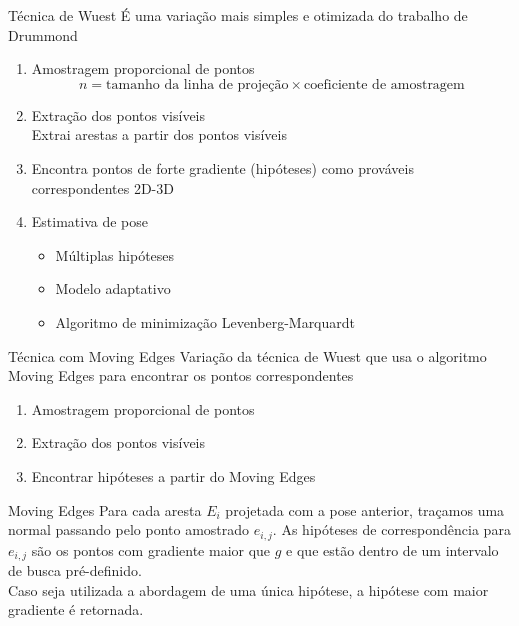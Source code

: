 \documentclass{beamer}
\begin{document}
\begin{frame}{Técnica de Wuest}
    É uma variação mais simples e otimizada do trabalho de Drummond
    \begin{enumerate}
        \item Amostragem proporcional de pontos
            \[
                n = \textrm{tamanho da linha de projeção} \times \textrm{coeficiente de amostragem}
            \]
        \item Extração dos pontos visíveis \\
            Extrai arestas a partir dos pontos visíveis
        \item Encontra pontos de forte gradiente (hipóteses) como prováveis correspondentes 2D-3D
        \item Estimativa de pose
            \begin{itemize}
                \item Múltiplas hipóteses
                \item Modelo adaptativo
                \item Algoritmo de minimização Levenberg-Marquardt
            \end{itemize}
    \end{enumerate}
\end{frame}

\begin{frame}{Técnica com Moving Edges}
    Variação da técnica de Wuest que usa o algoritmo Moving Edges para encontrar os pontos correspondentes
    \begin{enumerate}
        \item Amostragem proporcional de pontos
        \item Extração dos pontos visíveis
        \item Encontrar hipóteses a partir do Moving Edges
    \end{enumerate}
\end{frame}

\begin{frame}{Moving Edges}
    Para cada aresta $E_i$ projetada com a pose anterior, traçamos uma normal passando pelo ponto amostrado $e_{i,j}$. As hipóteses de correspondência para $e_{i,j}$ são os pontos com gradiente maior que $g$ e que estão dentro de um intervalo de busca pré-definido. \\
    \medskip
    Caso seja utilizada a abordagem de uma única hipótese, a hipótese com maior gradiente é retornada.
\end{frame}
\end{document}
